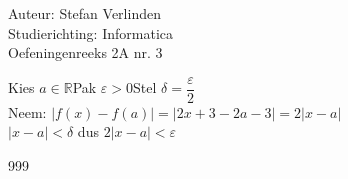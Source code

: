 \documentclass[a4paper]{article}
\begin{document}
  
\noindent \large Auteur: Stefan Verlinden \\
\noindent \large Studierichting: Informatica\\
\noindent \large Oefeningenreeks 2A nr. 3\\

\medskip

\normalsize

Kies $ a \in \mathbb{R} $\qquad Pak $ \varepsilon > 0 $\qquad Stel $ \delta = \dfrac{\varepsilon}{2} $\\

Neem: $ |f(x)-f(a)| = |2x+3-2a-3| = 2|x-a| $\\

$ |x-a| < \delta $ dus $ 2|x-a| < \varepsilon $

\begin{thebibliography}{999}
\end{thebibliography}
\end{document}
